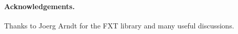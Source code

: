 \documentclass[12pt,a4paper]{article}
\begin{document}
\paragraph{Acknowledgements.}

Thanks to Joerg Arndt for the FXT library and many useful discussions.






%
\end{document}
